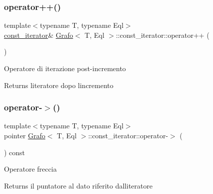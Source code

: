 \subsubsection{\texorpdfstring{operator++()}{operator++()}\hspace{0.1cm}{\footnotesize\ttfamily [2/2]}}
{\footnotesize\ttfamily template$<$typename T, typename Eql$>$ \\
\hyperlink{classGrafo_1_1const__iterator}{const\+\_\+iterator}\& \hyperlink{classGrafo}{Grafo}$<$ T, Eql $>$\+::const\+\_\+iterator\+::operator++ (\begin{DoxyParamCaption}{ }\end{DoxyParamCaption})\hspace{0.3cm}{\ttfamily [inline]}}

Operatore di iterazione post-\/incremento \begin{DoxyReturn}{Returns}
l\textquotesingle{}iteratore dopo l\textquotesingle{}incremento 
\end{DoxyReturn}
\mbox{\label{classGrafo_1_1const__iterator_ae0416460fa3e72996ec1bbd1d9150780}} 
\subsubsection{\texorpdfstring{operator-\/$>$()}{operator->()}}
{\footnotesize\ttfamily template$<$typename T, typename Eql$>$ \\
pointer \hyperlink{classGrafo}{Grafo}$<$ T, Eql $>$\+::const\+\_\+iterator\+::operator-\/$>$ (\begin{DoxyParamCaption}{ }\end{DoxyParamCaption}) const\hspace{0.3cm}{\ttfamily [inline]}}

Operatore freccia \begin{DoxyReturn}{Returns}
il puntatore al dato riferito dall\textquotesingle{}iteratore 
\end{DoxyReturn}
\mbox{\label{classGrafo_1_1const__iterator_a62111ac18ba2d3262984c00b30e98c7b}} 
